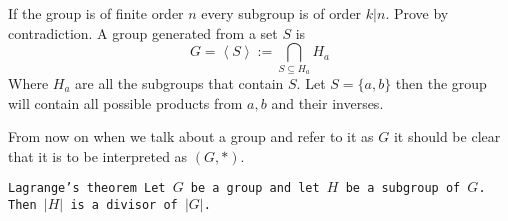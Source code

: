 \documentclass[11pt,a4paper]{article}
\begin{document}
  If the group is of finite order $n$ every subgroup is of order $k|n$.
  Prove by contradiction.
  A group generated from a set $S$ is
  \[
    G = \left<S\right> := \bigcap_{S \subseteq H_a}{H_a}
  \]
  Where $H_a$ are all the subgroups that contain $S$.
  Let $S = \{a,b\}$ then the group will contain all possible products 
  from $a,b$ and their inverses.


  \begin{remark}
    From now on when we talk about a group and refer to it as $G$ it should
    be clear that it is to be interpreted as $(G,*)$.
  \end{remark}

  \begin{theorem}\tt{Lagrange's theorem}
    Let $G$ be a group and let $H$ be a subgroup of $G$.
    Then $|H|$ is a divisor of $|G|$.
  \end{theorem}
  
\end{document}

